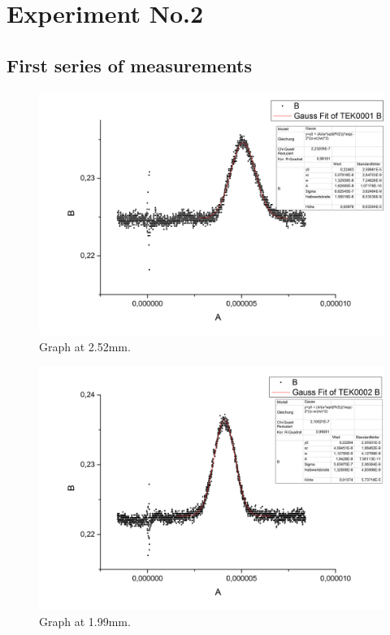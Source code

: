 \section*{Experiment No.2}
\subsection*{First series of measurements}
\begin{figure}[h]
\begin{center}
\includegraphics[scale=0.25]{Bilder/Teil2/Graph1}
\caption{Graph at 2.52mm.}
\label{fig:graph1}
\end{center}
\end{figure}
\begin{figure}[h]
\begin{center}
\includegraphics[scale=0.25]{Bilder/Teil2/Graph2}
\caption{Graph at 1.99mm.}
\label{fig:graph2}
\end{center}
\end{figure}
